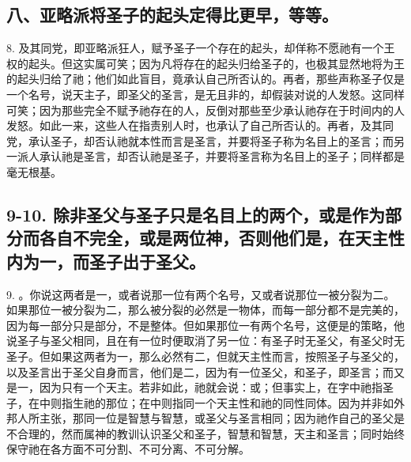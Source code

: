 
\subsection{八、亚略派将圣子的起头定得比更早，等等。}

8. 及其同党，即亚略派狂人，赋予圣子一个存在的起头，却佯称不愿祂有一个王权的起头。但这实属可笑；因为凡将存在的起头归给圣子的，也极其显然地将为王的起头归给了祂；他们如此盲目，竟承认自己所否认的。再者，那些声称圣子仅是一个名号，说天主子，即圣父的圣言，是无且非的，却假装对说的人发怒。这同样可笑；因为那些完全不赋予祂存在的人，反倒对那些至少承认祂存在于时间内的人发怒。如此一来，这些人在指责别人时，也承认了自己所否认的。再者，及其同党，承认圣子，却否认祂就本性而言是圣言，并要将圣子称为名目上的圣言；而另一派人承认祂是圣言，却否认祂是圣子，并要将圣言称为名目上的圣子；同样都是毫无根基。\par


\subsection{9-10. 除非圣父与圣子只是名目上的两个，或是作为部分而各自不完全，或是两位神，否则他们是，在天主性内为一，而圣子出于圣父。}

9. 。你说这两者是一，或者说那一位有两个名号，又或者说那位一被分裂为二。如果那位一被分裂为二，那么被分裂的必然是一物体，而每一部分都不是完美的，因为每一部分只是部分，不是整体。但如果那位一有两个名号，这便是的策略，他说圣子与圣父相同，且在有一位时便取消了另一位：有圣子时无圣父，有圣父时无圣子。但如果这两者为一，那么必然有二，但就天主性而言，按照圣子与圣父的，以及圣言出于圣父自身而言，他们是二，因为有一位圣父，和圣子，即圣言；而又是一，因为只有一个天主。若非如此，祂就会说：或；但事实上，在字中祂指圣子，在中则指生祂的那位；在中则指同一个天主性和祂的同性同体。因为并非如外邦人所主张，那同一位是智慧与智慧，或圣父与圣言相同；因为祂作自己的圣父是不合理的，然而属神的教训认识圣父和圣子，智慧和智慧，天主和圣言；同时始终保守祂在各方面不可分割、不可分离、不可分解。\par

